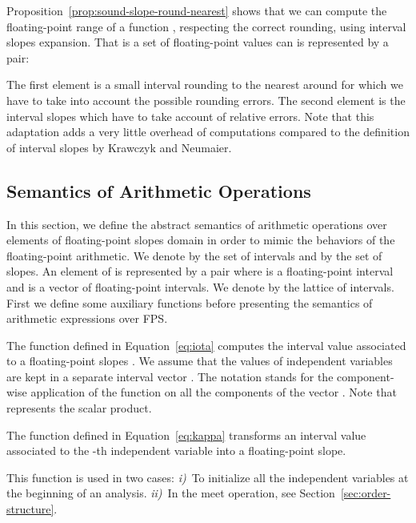 Proposition~\ref{prop:sound-slope-round-nearest} shows that we can
compute the floating-point range of a function , respecting
the correct rounding, using interval slopes expansion. That is a set
of floating-point values can is represented by a pair:{\small
  
}The first element is a small interval rounding to the nearest around
 for which we have to take into account the
possible rounding errors. The second element is the interval slopes
which have to take account of relative errors. Note that this
adaptation adds a very little overhead of computations compared to the
definition of interval slopes by Krawczyk and Neumaier.

\subsection{Semantics of Arithmetic Operations}
\label{sec:arithmetic-operations}

In this section, we define the abstract semantics of arithmetic
operations over elements of floating-point slopes domain in order to
mimic the behaviors of the floating-point arithmetic. We denote by
 the set of intervals and by  the
set of slopes. An element  of  is represented by a pair
 where  is a
floating-point interval and  is a vector of
floating-point intervals. We denote by  the lattice of
intervals. First we define some auxiliary functions before presenting
the semantics of arithmetic expressions over \textsf{FPS}.

The function  defined in Equation~\eqref{eq:iota} computes the
interval value associated to a floating-point slopes . We assume that the values of independent variables
are kept in a separate interval vector . The
notation  stands for the
component-wise application of the function  on all the
components of the vector . Note that 
represents the scalar product. {\small

}The function  defined in Equation~\eqref{eq:kappa} transforms
an interval value  associated to the -th independent
variable into a floating-point slope. {\small
  
}This function  is used in two cases: \textit{i)}~To
initialize all the independent variables at the beginning of an
analysis. \textit{ii)}~In the meet operation, see
Section~\ref{sec:order-structure}.

